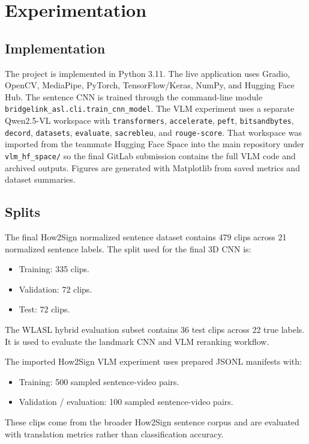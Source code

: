 \documentclass[10pt,twocolumn,letterpaper]{article}
\begin{document}
\section{Experimentation}

\subsection{Implementation}

The project is implemented in Python 3.11. The live application uses Gradio, OpenCV, MediaPipe, PyTorch, TensorFlow/Keras, NumPy, and Hugging Face Hub. The sentence CNN is trained through the command-line module \texttt{bridgelink\_asl.cli.train\_cnn\_model}. The VLM experiment uses a separate Qwen2.5-VL workspace with \texttt{transformers}, \texttt{accelerate}, \texttt{peft}, \texttt{bitsandbytes}, \texttt{decord}, \texttt{datasets}, \texttt{evaluate}, \texttt{sacrebleu}, and \texttt{rouge-score}. That workspace was imported from the teammate Hugging Face Space into the main repository under \texttt{vlm\_hf\_space/} so the final GitLab submission contains the full VLM code and archived outputs. Figures are generated with Matplotlib from saved metrics and dataset summaries.

\subsection{Splits}

The final How2Sign normalized sentence dataset contains 479 clips across 21 normalized sentence labels. The split used for the final 3D CNN is:
\begin{itemize}
    \item Training: 335 clips.
    \item Validation: 72 clips.
    \item Test: 72 clips.
\end{itemize}

The WLASL hybrid evaluation subset contains 36 test clips across 22 true labels. It is used to evaluate the landmark CNN and VLM reranking workflow.

The imported How2Sign VLM experiment uses prepared JSONL manifests with:
\begin{itemize}
    \item Training: 500 sampled sentence-video pairs.
    \item Validation / evaluation: 100 sampled sentence-video pairs.
\end{itemize}
These clips come from the broader How2Sign sentence corpus and are evaluated with translation metrics rather than classification accuracy.
\end{document}
